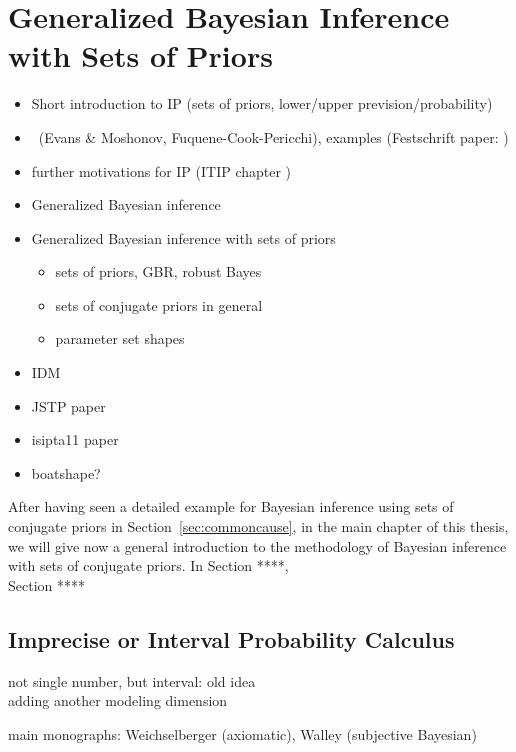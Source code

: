 \chapter{Generalized Bayesian Inference with Sets of Priors}

\begin{itemize}
\item Short introduction to IP (sets of priors, lower/upper prevision/probability)
\item \pdc\ (Evans \& Moshonov, Fuquene-Cook-Pericchi), examples (Festschrift paper: \cite{Walter2010a})
\item further motivations for IP (ITIP chapter \cite{itip-statinf}) 
\item Generalized Bayesian inference
\item Generalized Bayesian inference with sets of priors
 \begin{itemize}
 \item sets of priors, GBR, robust Bayes
 \item sets of conjugate priors in general
 \item parameter set shapes
 \end{itemize}
\item IDM
\item JSTP paper \cite{Walter2009a}
\item isipta11 paper \cite{Walter2011a}
\item boatshape?
\end{itemize}

After having seen a detailed example for Bayesian inference using sets of conjugate priors in Section~\ref{sec:commoncause},
in the main chapter of this thesis,
we will give now a general introduction to the methodology of Bayesian inference with sets of conjugate priors.
In Section ****, \\
Section **** 


\section{Imprecise or Interval Probability Calculus}
\label{sec:ip-intro}

not single number, but interval: old idea\\
adding another modeling dimension

main monographs: Weichselberger (axiomatic), Walley (subjective Bayesian)

